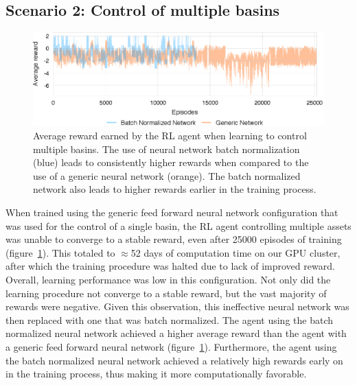 \subsection{Scenario 2: Control of multiple basins}

\begin{figure}
    \centering
    \includegraphics[width=\textwidth]{gfx/Chapter-3/system_tarining.eps}
    \caption{Average reward earned by the RL agent when learning to control multiple basins. The use of neural network batch normalization (blue) leads to consistently higher rewards when compared to the use of a generic neural network (orange).  The batch normalized network also leads to higher rewards earlier in the training process.}
    \label{fig:4}
\end{figure}


When trained using the generic feed forward neural network configuration that was used for the control of a single basin, the RL agent controlling multiple assets was unable to converge to a stable reward, even after 25000 episodes of training (figure~\ref{fig:4}).
This totaled to $\approx$52 days of computation time on our GPU cluster, after which the training procedure was halted due to lack of improved reward.
Overall, learning performance was low in this configuration.
Not only did the learning procedure not converge to a stable reward, but the vast majority of rewards were negative.
Given this observation, this ineffective neural network was then replaced with one that was batch normalized.
The agent using the batch normalized neural network achieved a higher average reward than the agent with a generic feed forward neural network (figure~\ref{fig:4}).
Furthermore, the agent using the batch normalized neural network achieved a relatively high rewards early on in the training process, thus making it more computationally favorable.

